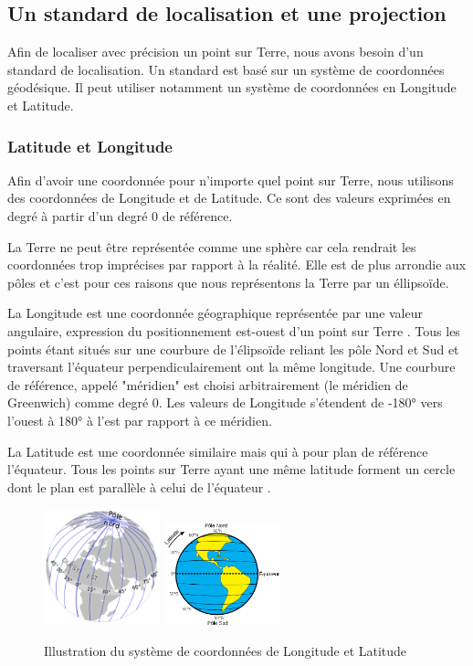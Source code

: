 \documentclass{article}
\begin{document}
\subsection{Un standard de localisation et une projection}

Afin de localiser avec précision un point sur Terre, nous avons besoin d'un standard de localisation. Un standard est basé sur un système de coordonnées géodésique. Il peut utiliser notamment un système de coordonnées en Longitude et Latitude.

\subsubsection{Latitude et Longitude}

Afin d'avoir une coordonnée pour n'importe quel point sur Terre, nous utilisons des coordonnées de Longitude et de Latitude. Ce sont des valeurs exprimées en degré à partir d'un degré 0 de référence.

La Terre ne peut être représentée comme une sphère car cela rendrait les coordonnées trop imprécises par rapport à la réalité. Elle est de plus arrondie aux pôles et c'est pour ces raisons que nous représentons la Terre par un éllipsoïde. 

La Longitude est une coordonnée géographique représentée par une valeur angulaire, expression du positionnement est-ouest d'un point sur Terre \cite{frwiki:188614923}. Tous les points étant situés sur une courbure de l'élipsoïde reliant les pôle Nord et Sud et traversant l'équateur     perpendiculairement ont la même longitude. Une courbure de référence, appelé "méridien" est choisi arbitrairement (le méridien de Greenwich) comme degré 0. Les valeurs de Longitude s'étendent de -180° vers l'ouest à 180° à l'est par rapport à ce méridien. 

La Latitude est une coordonnée similaire mais qui à pour plan de référence l'équateur. Tous les points sur Terre ayant une même latitude forment un cercle dont le plan est parallèle à celui de l'équateur \cite{frwiki:189341688}. 

\begin{figure}[H]
    \centering
    \includegraphics[width=0.3\textwidth]{Images/Cartographie/Longitude.png}
    \includegraphics[width=0.3\textwidth]{Images/Cartographie/Latitude.png}
    \caption{Illustration du système de coordonnées de Longitude et Latitude}
\end{figure}
\end{document}
